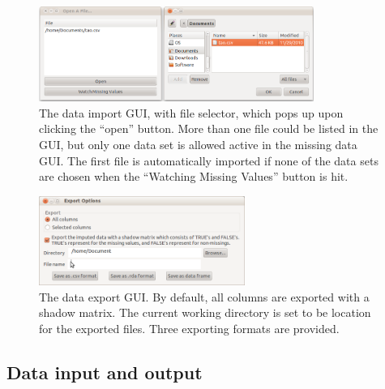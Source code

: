\documentclass[article]{jss}
\begin{document}
\begin{center}
\begin{figure}[!h]
\begin{centering}
\includegraphics[width=0.8\textwidth]{graph/fig6-open}
\par\end{centering}
\caption{The data import GUI, with file selector, which pops up upon clicking the ``open'' button. More than one file could be listed in the GUI, but only one data set is allowed active in the missing data GUI. The first file is automatically imported if none of the data sets are chosen when the ``Watching Missing Values'' button is hit.}
\label{fig: import}
\end{figure}
\par\end{center}


\begin{center}
\begin{figure}[!h]
\begin{centering}
\includegraphics[width=0.6\textwidth]{graph/fig7-export}
\par\end{centering}
\caption{The data export GUI. By default, all columns are exported with a shadow matrix. The current working directory is set to be location for the exported files. Three exporting formats are provided.}
\label{fig: export}
\end{figure}
\par\end{center}

\subsection{Data input and output}
\end{document}

